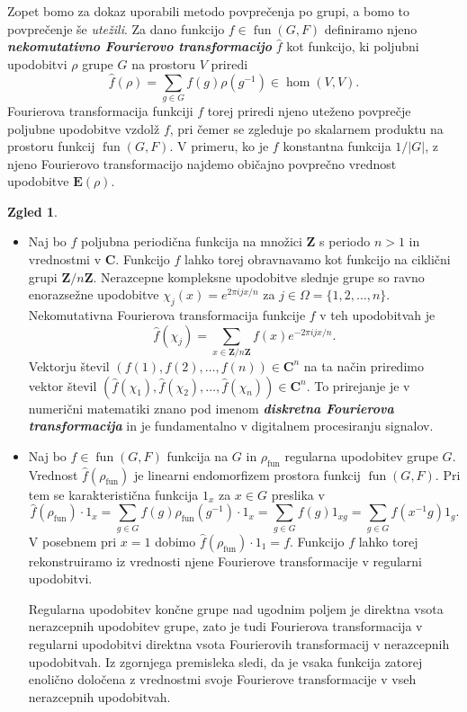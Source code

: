 \documentclass[11pt]{book}
\def\ZZ{\mathbf{Z}}
\def\CC{\mathbf{C}}
\def\EE{\mathbf{E}}
\DeclareMathOperator\fun{fun}
\def\definicija{\color{rdeca}\bf\em}
\theoremstyle{definition}
\theoremstyle{zgled}
\newtheorem*{zgled}{Zgled}
\theoremstyle{odprtproblem}
\theoremstyle{domacanaloga}
\theoremstyle{izrek}
\begin{document}
Zopet bomo za dokaz uporabili metodo povprečenja po grupi, a bomo to povprečenje še \emph{utežili}. Za dano funkcijo $f \in \fun(G,F)$ definiramo njeno {\definicija nekomutativno Fourierovo transformacijo} $\hat{f}$ kot funkcijo, ki poljubni upodobitvi $\rho$ grupe $G$ na prostoru $V$ priredi
\[
    \hat{f}(\rho) = \sum_{g \in G} f(g) \rho(g^{-1}) \in \hom(V,V).
\]
Fourierova transformacija funkciji $f$ torej priredi njeno uteženo povprečje poljubne upodobitve vzdolž $f$, pri čemer se zgleduje po skalarnem produktu na prostoru funkcij $\fun(G,F)$. V primeru, ko je $f$ konstantna funkcija $1/|G|$, z njeno Fourierovo transformacijo najdemo običajno povprečno vrednost upodobitve $\EE(\rho)$.

\begin{zgled} \leavevmode
\begin{itemize}
    \item Naj bo $f$ poljubna periodična funkcija na množici $\ZZ$ s periodo $n > 1$ in vrednostmi v $\CC$. Funkcijo $f$ lahko torej obravnavamo kot funkcijo na ciklični grupi $\ZZ/n\ZZ$. Nerazcepne kompleksne upodobitve slednje grupe so ravno enorazsežne upodobitve $\chi_j(x) = e^{2 \pi i j x / n}$ za $j \in \Omega = \{ 1, 2, \dots, n \}$. Nekomutativna Fourierova transformacija funkcije $f$ v teh upodobitvah je
    \[
        \hat{f}(\chi_j) = \sum_{x \in \ZZ/n\ZZ} f(x) e^{- 2 \pi i j x / n }.
    \]
    Vektorju števil $(f(1), f(2), \dots, f(n)) \in \CC^n$ na ta način priredimo vektor števil $(\hat{f}(\chi_1), \hat{f}(\chi_2), \dots, \hat{f}(\chi_n)) \in \CC^n$. To prirejanje je v numerični matematiki znano pod imenom {\definicija diskretna Fourierova transformacija} in je fundamentalno v digitalnem procesiranju signalov.

    \item Naj bo $f \in \fun(G,F)$ funkcija na $G$ in $\rho_{\fun}$ regularna upodobitev grupe $G$. Vrednost $\hat{f}(\rho_{\fun})$ je linearni endomorfizem prostora funkcij $\fun(G,F)$. Pri tem se karakteristična funkcija $1_x$ za $x \in G$ preslika v
\[
    \hat{f}(\rho_{\fun}) \cdot 1_x 
    = \sum_{g \in G} f(g) \rho_{\fun}(g^{-1}) \cdot 1_x
    = \sum_{g \in G} f(g) 1_{xg}
    = \sum_{g \in G} f(x^{-1}g) 1_{g}.
\] 
V posebnem pri $x = 1$ dobimo $\hat{f}(\rho_{\fun}) \cdot 1_1 = f$. Funkcijo $f$ lahko torej rekonstruiramo iz vrednosti njene Fourierove transformacije v regularni upodobitvi. 

Regularna upodobitev končne grupe nad ugodnim poljem je direktna vsota nerazcepnih upodobitev grupe, zato je tudi Fourierova transformacija v regularni upodobitvi direktna vsota Fourierovih transformacij v nerazcepnih upodobitvah. Iz zgornjega premisleka sledi, da je vsaka funkcija zatorej enolično določena z vrednostmi svoje Fourierove transformacije v vseh nerazcepnih upodobitvah.
\end{itemize}
\end{zgled}
\end{document}
